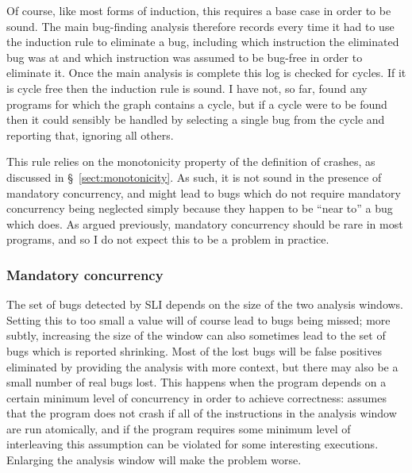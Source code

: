 Of course, like most forms of induction, this requires a base case in
order to be sound.  The main bug-finding analysis therefore records
every time it had to use the induction rule to eliminate a bug,
including which instruction the eliminated bug was at and which
instruction was assumed to be bug-free in order to eliminate it.  Once
the main analysis is complete this log is checked for cycles.  If it
is cycle free then the induction rule is sound.  I have not, so far,
found any programs for which the graph contains a cycle, but if a
cycle were to be found then it could sensibly be handled by selecting
a single bug from the cycle and reporting that, ignoring all others.

This rule relies on the monotonicity property of the definition of
crashes, as discussed in \S~\ref{sect:monotonicity}.  As such, it is
not sound in the presence of mandatory concurrency, and might lead to
bugs which do not require mandatory concurrency being neglected simply
because they happen to be ``near to'' a bug which does.  As argued
previously, mandatory concurrency should be rare in most programs, and
so I do not expect this to be a problem in practice.  


\subsubsection{Mandatory concurrency}
\label{sect:mandatory_concurrency}


The set of bugs detected by SLI depends on the size of the two
analysis windows.  Setting this to too small a value will of course
lead to bugs being missed; more subtly, increasing the size of the
window can also sometimes lead to the set of bugs which is reported
shrinking.  Most of the lost bugs will be false positives eliminated
by providing the analysis with more context, but there may also be a
small number of real bugs lost.  This happens when the program depends
on a certain minimum level of concurrency in order to achieve
correctness: {\technique} assumes that the program does not crash if
all of the instructions in the analysis window are run atomically, and
if the program requires some minimum level of interleaving this
assumption can be violated for some interesting executions.  Enlarging
the analysis window will make the problem worse.

